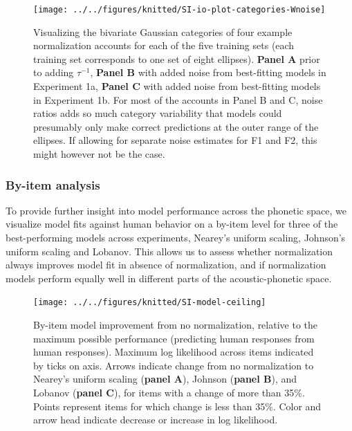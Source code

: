 \documentclass[preprint]{JASA}
\begin{document}
\begin{figure}

{\centering \texttt{[image: ../../figures/knitted/SI-io-plot-categories-Wnoise]} 

}

\caption{Visualizing the bivariate Gaussian categories of four example normalization accounts for each of the five training sets (each training set corresponds to one set of eight ellipses). \textbf{Panel A} prior to adding \(\tau^{-1}\), \textbf{Panel B} with added noise from best-fitting models in Experiment 1a, \textbf{Panel C} with added noise from best-fitting models in Experiment 1b. For most of the accounts in Panel B and C, noise ratios adds so much category variability that models could presumably only make correct predictions at the outer range of the ellipses. If allowing for separate noise estimates for F1 and F2, this might however not be the case.}\label{fig:SI-io-plot-categories-Wnoise}
\end{figure}

\subsubsection{By-item analysis}\label{sec:SI-by-item}

To provide further insight into model performance across the phonetic space, we visualize model fits against human behavior on a by-item level for three of the best-performing models across experiments, Nearey's uniform scaling, Johnson's uniform scaling and Lobanov. This allows us to assess whether normalization always improves model fit in absence of normalization, and if normalization models perform equally well in different parts of the acoustic-phonetic space.



\begin{figure}

{\centering \texttt{[image: ../../figures/knitted/SI-model-ceiling]} 

}

\caption{By-item model improvement from no normalization, relative to the maximum possible performance (predicting human responses from human responses). Maximum log likelihood across items indicated by ticks on axis. Arrows indicate change from no normalization to Nearey's uniform scaling (\textbf{panel A}), Johnson (\textbf{panel B}), and Lobanov (\textbf{panel C}), for items with a change of more than 35\%. Points represent items for which change is less than 35\%. Color and arrow head indicate decrease or increase in log likelihood.}\label{fig:SI-model-ceiling}
\end{figure}
\end{document}
